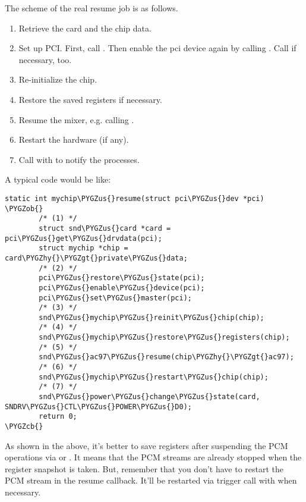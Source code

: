 \documentclass[a4paper,8pt,english]{sphinxmanual}
\def\PYGZus{\char`\_}
\def\PYGZob{\char`\{}
\def\PYGZcb{\char`\}}
\def\PYGZgt{\char`\>}
\def\PYGZhy{\char`\-}
\begin{document}
The scheme of the real resume job is as follows.
\begin{enumerate}
\item {} 
Retrieve the card and the chip data.

\item {} 
Set up PCI. First, call . Then
enable the pci device again by calling
. Call
 if necessary, too.

\item {} 
Re-initialize the chip.

\item {} 
Restore the saved registers if necessary.

\item {} 
Resume the mixer, e.g. calling {\hyperref[sound/kernel\string-api/alsa\string-driver\string-api:c.snd_ac97_resume]{\emph{}}}.

\item {} 
Restart the hardware (if any).

\item {} 
Call  with
 to notify the processes.

\end{enumerate}

A typical code would be like:

\begin{Verbatim}[commandchars=\\\{\}]
static int mychip\PYGZus{}resume(struct pci\PYGZus{}dev *pci)
\PYGZob{}
        /* (1) */
        struct snd\PYGZus{}card *card = pci\PYGZus{}get\PYGZus{}drvdata(pci);
        struct mychip *chip = card\PYGZhy{}\PYGZgt{}private\PYGZus{}data;
        /* (2) */
        pci\PYGZus{}restore\PYGZus{}state(pci);
        pci\PYGZus{}enable\PYGZus{}device(pci);
        pci\PYGZus{}set\PYGZus{}master(pci);
        /* (3) */
        snd\PYGZus{}mychip\PYGZus{}reinit\PYGZus{}chip(chip);
        /* (4) */
        snd\PYGZus{}mychip\PYGZus{}restore\PYGZus{}registers(chip);
        /* (5) */
        snd\PYGZus{}ac97\PYGZus{}resume(chip\PYGZhy{}\PYGZgt{}ac97);
        /* (6) */
        snd\PYGZus{}mychip\PYGZus{}restart\PYGZus{}chip(chip);
        /* (7) */
        snd\PYGZus{}power\PYGZus{}change\PYGZus{}state(card, SNDRV\PYGZus{}CTL\PYGZus{}POWER\PYGZus{}D0);
        return 0;
\PYGZcb{}
\end{Verbatim}

As shown in the above, it's better to save registers after suspending
the PCM operations via  or
. It means that the PCM streams are
already stopped when the register snapshot is taken. But, remember that
you don't have to restart the PCM stream in the resume callback. It'll
be restarted via trigger call with  when
necessary.
\end{document}
